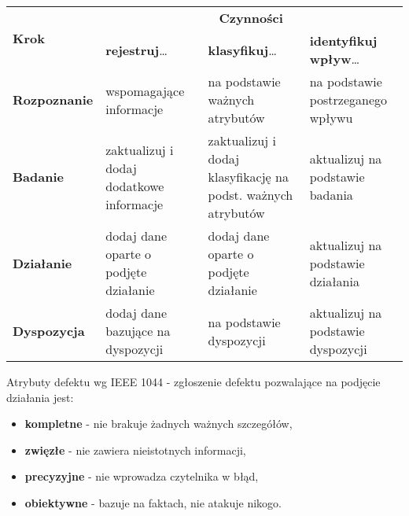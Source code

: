 \documentclass[../main.tex]{subfiles}
\begin{document}
    \begin{table}[H]
        \begin{center}
            \begin{tabular}{ | p{3cm} | p{3cm} | p{3cm} | p{3cm} |}
                \hline
                \multirow{2}{*}{\textbf{Krok}} & \multicolumn{3}{c|}{\textbf{Czynności}}\\
                \cline{2-4}
                \multirow{2}{*}{} & \textbf{rejestruj}\ldots & \textbf{klasyfikuj}\ldots & \textbf{identyfikuj wpływ}\ldots\\
                \hline
                \textbf{Rozpoznanie }& wspomagające informacje
                & na podstawie ważnych atrybutów
                & na podstawie postrzeganego wpływu\\
                \hline
                \textbf{Badanie}
                & zaktualizuj i dodaj dodatkowe informacje
                & zaktualizuj i dodaj klasyfikację na podst. ważnych atrybutów
                & aktualizuj na podstawie badania\\
                \hline
                \textbf{Działanie}
                & dodaj dane oparte o podjęte działanie
                & dodaj dane oparte o podjęte działanie
                & aktualizuj na podstawie działania\\
                \hline
                \textbf{Dyspozycja}
                & dodaj dane bazujące na dyspozycji
                & na podstawie dyspozycji
                & aktualizuj na podstawie dyspozycji\\
                \hline
            \end{tabular}
        \end{center}
    \end{table}

    Atrybuty defektu wg IEEE 1044 - zgłoszenie defektu pozwalające na podjęcie działania jest:
    \begin{itemize}
        \item \textbf{kompletne} - nie brakuje żadnych ważnych szczegółów,
        \item \textbf{zwięzłe} - nie zawiera nieistotnych informacji,
        \item \textbf{precyzyjne} - nie wprowadza czytelnika w błąd,
        \item \textbf{obiektywne} - bazuje na faktach, nie atakuje nikogo.
    \end{itemize}
\end{document}
